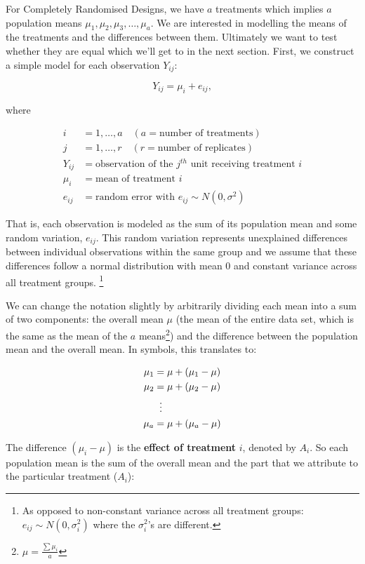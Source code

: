 \documentclass[
  letterpaper,
]{book}
\begin{document}
For Completely Randomised Designs, we have \(a\) treatments which
implies \(a\) population means \(\mu_1, \mu_2, \mu_3, \ldots, \mu_a\).
We are interested in modelling the means of the treatments and the
differences between them. Ultimately we want to test whether they are
equal which we'll get to in the next section. First, we construct a
simple model for each observation \(Y_{ij}\):

\[
Y_{ij} = \mu_{i} + e_{ij},
\]

where

\[
\begin{aligned}
i & = 1, \dots, a \quad (a = \text{number of treatments}) \\
j & = 1, \dots, r \quad (r = \text{number of replicates}) \\
Y_{ij} & = \text{observation of the } j^{th} \text{ unit receiving treatment } i \\
\mu_i & = \text{mean of treatment } i \\
e_{ij} & = \text{random error with } e_{ij} \sim N(0, \sigma^2)
\end{aligned}
\]

That is, each observation is modeled as the sum of its population mean
and some random variation, \(e_{ij}\). This random variation represents
unexplained differences between individual observations within the same
group and we assume that these differences follow a normal distribution
with mean 0 and constant variance across all treatment groups.
\footnote{As opposed to non-constant variance across all treatment
  groups: \(e_{ij} \sim N(0, \sigma^2_{i})\) where the \(\sigma_i^2\)'s
  are different.}

We can change the notation slightly by arbitrarily dividing each mean
into a sum of two components: the overall mean \(\mu\) (the mean of the
entire data set, which is the same as the mean of the \(a\)
means\footnote{\(\mu = \frac{\sum\mu_i}{a}\)}) and the difference
between the population mean and the overall mean. In symbols, this
translates to:

\[
\begin{aligned}
\mu_1 &= \mu + (\mu_1 - \mu) \\
\mu_2 &= \mu + (\mu_2 - \mu) \\
&\;\;\vdots \notag \\
\mu_a &= \mu + (\mu_a - \mu)
\end{aligned}
\]

The difference \((\mu_i - \mu)\) is the \textbf{effect of treatment}
\(i\), denoted by \(A_i\). So each population mean is the sum of the
overall mean and the part that we attribute to the particular treatment
(\(A_i\)):
\end{document}
